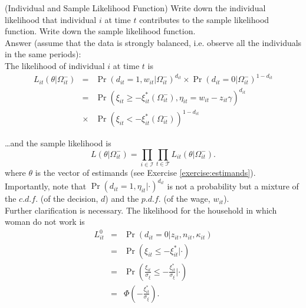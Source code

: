 \begin{exercise} (Individual and Sample Likelihood Function)
Write down the individual likelihood that individual $i$ at time $t$ contributes to the sample likelihood function. Write down the sample likelihood function.\\
\noindent Answer (assume that the data is strongly balanced, i.e. observe all the individuals in the same periods):\\
\noindent The likelihood of individual $i$ at time $t$ is
\begin{eqnarray}
L_{it} \left( \theta | \Omega_{it}^{-} \right) &=& \Pr \left(  d_{it} = 1, w_{it} | \Omega_{it}^{-} \right)^{d_{it}} \times \Pr \left(  d_{it} = 0 | \Omega_{it}^{-} \right)^{1-d_{it}} \nonumber \\
&=& \Pr \left( \xi_{it} \geq - \xi_{it}^{*} \left(\Omega_{it}^{-} \right), \eta_{it} = w_{it} - z_{it} \gamma  \right) ^{d_{it}} \nonumber \\  
&\times& \Pr \left( \xi_{it} < - \xi_{it}^{*} \left(\Omega_{it}^{-} \right) \right) ^{1 - d_{it}}
\end{eqnarray}

\noindent \ldots and the sample likelihood is
\begin{equation}
L \left( \theta | \Omega_{it}^{-} \right) = \prod \limits _{i \in \mathcal{I}} \prod \limits _{t \in \mathcal{T}} L_{it} \left( \theta | \Omega_{it} ^{-} \right).
\end{equation}
\noindent where $\theta$ is the vector of estimands (see Exercise \ref{exercise:estimands}). Importantly, note that $\Pr \left(  d_{it} = 1, \eta_{it} | \cdot \right)^{d_{it}}$ is not a probability but a mixture of the $c.d.f.$ (of the decision, $d$) and the $p.d.f.$ (of the wage, $w_{it}$).\\
\noindent Further clarification is necessary. The likelihood for the household in which woman do not work is
\begin{eqnarray}
L_{it}^{0} &=& \Pr \left( d_{it} = 0 | z_{it}, n_{it}, \kappa_{it} \right) \nonumber \\
       &=& \Pr \left( \xi_{it} \leq - \xi_{it}^{*} | \cdot \right) \nonumber \\
       &=& \Pr \left( \frac{\xi_{it}}{\sigma_{\xi}} \leq - \frac{\xi_{it}^{*}}{\sigma_{\xi}} | \cdot \right) \nonumber \\
       &=& \Phi \left( - \frac{\xi_{it}^{*}}{\sigma_{\xi}}  \right). 
\end{eqnarray}


\end{exercise}
